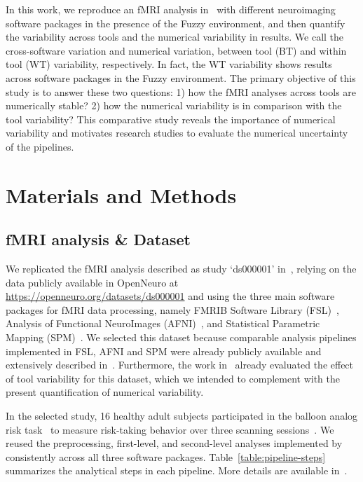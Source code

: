 \documentclass[conference]{IEEEtran}
\begin{document}
In this work, we reproduce an fMRI analysis in~\cite{bowring2019exploring} with different neuroimaging software packages in the presence of the Fuzzy environment,
and then quantify the variability across tools and the numerical variability in results.
We call the cross-software variation and numerical variation, between tool (BT) and within tool (WT) variability, respectively.
In fact, the WT variability shows results across software packages in the Fuzzy environment.
The primary objective of this study is to answer these two questions: 1) how the fMRI analyses across tools are numerically stable?
2) how the numerical variability is in comparison with the tool variability?
This comparative study reveals the importance of numerical variability and motivates research studies to evaluate the numerical uncertainty of the pipelines.



\section{Materials and Methods}

\subsection{fMRI analysis \& Dataset}

We replicated the fMRI analysis described as study `ds000001'
in~\cite{schonberg2012decreasing}, relying on the data publicly available
in OpenNeuro at \url{https://openneuro.org/datasets/ds000001} and using the
three main software packages for fMRI data processing, namely FMRIB
Software Library (FSL)~\cite{jenkinson2012fsl}, Analysis of Functional
NeuroImages (AFNI)~\cite{cox1996afni}, and Statistical Parametric
Mapping (SPM)~\cite{penny2011statistical}. We selected this dataset because
comparable analysis pipelines implemented in FSL, AFNI and SPM were already 
publicly available and extensively described in~\cite{bowring2019exploring}.
Furthermore, the work in~\cite{bowring2019exploring} already evaluated the
effect of tool variability for this dataset, which we intended to
complement with the present quantification of numerical variability.

In the selected study, 16 healthy adult subjects participated in the
balloon analog risk task~\cite{lejuez2002evaluation} to measure risk-taking
behavior over three scanning sessions~\cite{schonberg2012decreasing}. We
reused the preprocessing, first-level, and second-level analyses
implemented by~\cite{bowring2019exploring} consistently across all three
software packages. Table~\ref{table:pipeline-steps} summarizes the analytical steps in each
pipeline. More details are available in~\cite{bowring2019exploring}.
\end{document}
